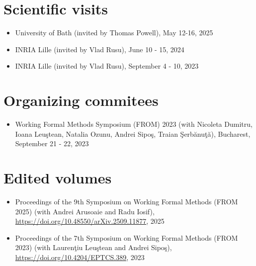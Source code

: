 \documentclass[letterpaper,11pt,oneside]{article}
\begin{document}
\noindent
\section{Scientific visits}
\normalsize 
\begin{itemize}
    \item University of Bath (invited by Thomas Powell), May 12-16, 2025
    \item INRIA Lille (invited by Vlad Rusu), June 10 - 15, 2024
    \item INRIA Lille (invited by Vlad Rusu), September 4 - 10, 2023
\end{itemize}
\mbox{}


\noindent
\section{Organizing commitees}
\normalsize 
\begin{itemize}
    \item Working Formal Methods Symposium (FROM) 2023
    (with Nicoleta Dumitru, Ioana Leu\c{s}tean, Natalia Ozunu, Andrei Sipo\c{s}, Traian \c{S}erb\u{a}nu\c{t}\u{a}), Bucharest, September 21 - 22, 2023
\end{itemize}
\mbox{}

\noindent 
\section{Edited volumes}
\normalsize 
\begin{itemize}
    \item Proceedings of the 9th Symposium on Working Formal Methods (FROM 2025) 
    (with Andrei Arusoaie and Radu Iosif),
    \url{https://doi.org/10.48550/arXiv.2509.11877}, 2025
    \item Proceedings of the 7th Symposium on Working Formal Methods (FROM 2023) 
    (with Lauren\c{t}iu Leu\c{s}tean and Andrei Sipo\c{s}), 
    \url{https://doi.org/10.4204/EPTCS.389}, 2023
\end{itemize}

\noindent
\end{document}
